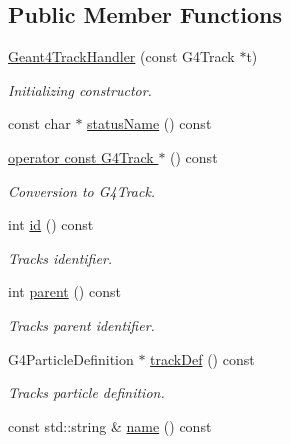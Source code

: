 \subsection*{Public Member Functions}
\begin{DoxyCompactItemize}
\item 
\hyperlink{class_d_d4hep_1_1_simulation_1_1_geant4_track_handler_a265dee4b9cf7103db1a6ea66941d300a}{Geant4\+Track\+Handler} (const G4\+Track $\ast$t)
\begin{DoxyCompactList}\small\item\em Initializing constructor. \end{DoxyCompactList}\item 
const char $\ast$ \hyperlink{class_d_d4hep_1_1_simulation_1_1_geant4_track_handler_a402c1436c1bbd21912b4eec241825d32}{status\+Name} () const
\item 
\hyperlink{class_d_d4hep_1_1_simulation_1_1_geant4_track_handler_a6a8487e74ce467e4792ec60cf9846f9e}{operator const G4\+Track $\ast$} () const
\begin{DoxyCompactList}\small\item\em Conversion to G4\+Track. \end{DoxyCompactList}\item 
int \hyperlink{class_d_d4hep_1_1_simulation_1_1_geant4_track_handler_ab7681e7aa6c392a8cdbd41d9d3e7c7b9}{id} () const
\begin{DoxyCompactList}\small\item\em Track\textquotesingle{}s identifier. \end{DoxyCompactList}\item 
int \hyperlink{class_d_d4hep_1_1_simulation_1_1_geant4_track_handler_a9af21d940686e7a243eebea3676b0cca}{parent} () const
\begin{DoxyCompactList}\small\item\em Track\textquotesingle{}s parent identifier. \end{DoxyCompactList}\item 
G4\+Particle\+Definition $\ast$ \hyperlink{class_d_d4hep_1_1_simulation_1_1_geant4_track_handler_ac6cfe20cc38d006243a07e9f9b8c198f}{track\+Def} () const
\begin{DoxyCompactList}\small\item\em Track\textquotesingle{}s particle definition. \end{DoxyCompactList}\item 
const std\+::string \& \hyperlink{class_d_d4hep_1_1_simulation_1_1_geant4_track_handler_a946b340138f8d53ae394980251f32e77}{name} () const

\end{DoxyCompactItemize}
